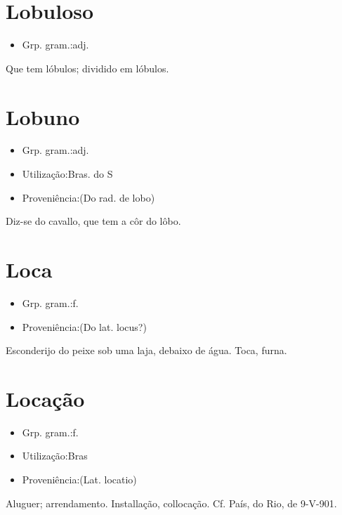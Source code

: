 \section{Lobuloso}
\begin{itemize}
\item {Grp. gram.:adj.}
\end{itemize}
Que tem lóbulos; dividido em lóbulos.
\section{Lobuno}
\begin{itemize}
\item {Grp. gram.:adj.}
\end{itemize}
\begin{itemize}
\item {Utilização:Bras. do S}
\end{itemize}
\begin{itemize}
\item {Proveniência:(Do rad. de \textunderscore lobo\textunderscore )}
\end{itemize}
Diz-se do cavallo, que tem a côr do lôbo.
\section{Loca}
\begin{itemize}
\item {Grp. gram.:f.}
\end{itemize}
\begin{itemize}
\item {Proveniência:(Do lat. \textunderscore locus\textunderscore ?)}
\end{itemize}
Esconderijo do peixe sob uma laja, debaixo de água.
Toca, furna.
\section{Locação}
\begin{itemize}
\item {Grp. gram.:f.}
\end{itemize}
\begin{itemize}
\item {Utilização:Bras}
\end{itemize}
\begin{itemize}
\item {Proveniência:(Lat. \textunderscore locatio\textunderscore )}
\end{itemize}
Aluguer; arrendamento.
Installação, collocação. Cf. \textunderscore País\textunderscore , do Rio, de 9-V-901.
